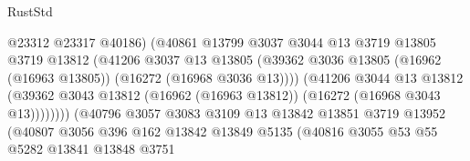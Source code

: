 \begin{lexlean}{RustStd}
\begin{coremodule}
                                          @23312
                                          @23317
                                          @40186)
                                        (@40861
                                          @13799
                                          @3037
                                          @3044
                                          @13
                                          @3719
                                          @13805
                                          @3719
                                          @13812
                                          (@41206
                                            @3037
                                            @13
                                            @13805
                                            (@39362
                                              @3036
                                              @13805
                                              (@16962 (@16963 @13805))
                                              (@16272 (@16968 @3036 @13))))
                                          (@41206
                                            @3044
                                            @13
                                            @13812
                                            (@39362
                                              @3043
                                              @13812
                                              (@16962 (@16963 @13812))
                                              (@16272 (@16968 @3043 @13))))))))
                                  (@40796
                                    @3057
                                    @3083
                                    @3109
                                    @13
                                    @13842
                                    @13851
                                    @3719
                                    @13952
                                    (@40807
                                      @3056
                                      @396
                                      @162
                                      @13842
                                      @13849
                                      @5135
                                      (@40816
                                        @3055
                                        @53
                                        @55
                                        @5282
                                        @13841
                                        @13848
                                        @3751

\end{coremodule}
\end{lexlean}
